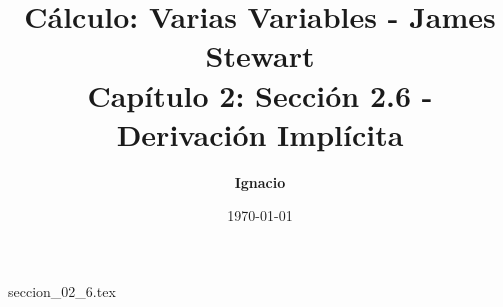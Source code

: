 \documentclass[11pt,spanish,oneside]{report}
\title{\textbf{Cálculo: Varias Variables - James Stewart} \\ \Large Capítulo 2: Sección 2.6 - Derivación Implícita}
\author{\textbf{Ignacio}}
\date{\today}
\begin{document}
\maketitle

{seccion_02_6.tex}
\end{document}
